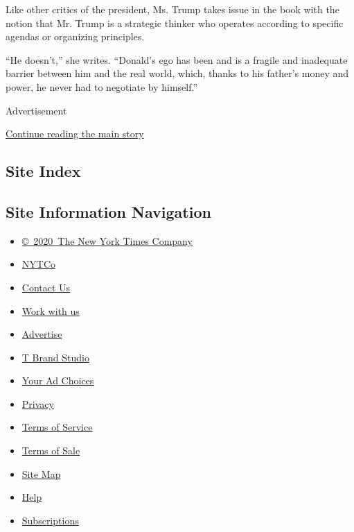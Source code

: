 Like other critics of the president, Ms. Trump takes issue in the book
with the notion that Mr. Trump is a strategic thinker who operates
according to specific agendas or organizing principles.

``He doesn't,'' she writes. ``Donald's ego has been and is a fragile and
inadequate barrier between him and the real world, which, thanks to his
father's money and power, he never had to negotiate by himself.''

Advertisement

\protect\hyperlink{after-bottom}{Continue reading the main story}

\hypertarget{site-index}{%
\subsection{Site Index}\label{site-index}}

\hypertarget{site-information-navigation}{%
\subsection{Site Information
Navigation}\label{site-information-navigation}}

\begin{itemize}
\tightlist
\item
  \href{https://help.nytimes.com/hc/en-us/articles/115014792127-Copyright-notice}{©~2020~The
  New York Times Company}
\end{itemize}

\begin{itemize}
\tightlist
\item
  \href{https://www.nytco.com/}{NYTCo}
\item
  \href{https://help.nytimes.com/hc/en-us/articles/115015385887-Contact-Us}{Contact
  Us}
\item
  \href{https://www.nytco.com/careers/}{Work with us}
\item
  \href{https://nytmediakit.com/}{Advertise}
\item
  \href{http://www.tbrandstudio.com/}{T Brand Studio}
\item
  \href{https://www.nytimes.com/privacy/cookie-policy\#how-do-i-manage-trackers}{Your
  Ad Choices}
\item
  \href{https://www.nytimes.com/privacy}{Privacy}
\item
  \href{https://help.nytimes.com/hc/en-us/articles/115014893428-Terms-of-service}{Terms
  of Service}
\item
  \href{https://help.nytimes.com/hc/en-us/articles/115014893968-Terms-of-sale}{Terms
  of Sale}
\item
  \href{https://spiderbites.nytimes.com}{Site Map}
\item
  \href{https://help.nytimes.com/hc/en-us}{Help}
\item
  \href{https://www.nytimes.com/subscription?campaignId=37WXW}{Subscriptions}
\end{itemize}
